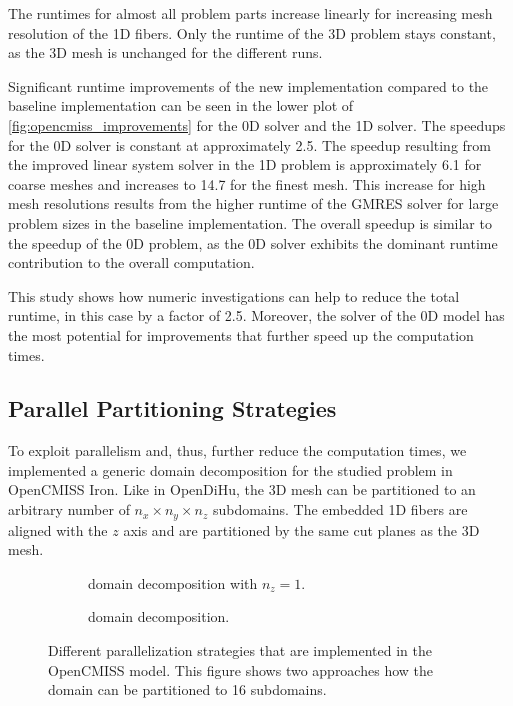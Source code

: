 The runtimes for almost all problem parts increase linearly for increasing mesh resolution of the 1D fibers. Only the runtime of the 3D problem stays constant, as the 3D mesh is unchanged for the different runs.

Significant runtime improvements of the new implementation compared to the baseline implementation can be seen in the lower plot of   \cref{fig:opencmiss_improvements} for the 0D solver and the 1D solver. The speedups for the 0D solver is constant at approximately 2.5. The speedup resulting from the improved linear system solver in the 1D problem is approximately 6.1 for coarse meshes and increases to 14.7 for the finest mesh. This increase for high mesh resolutions results from the higher runtime of the GMRES solver for large problem sizes in the baseline implementation. The overall speedup is similar to the speedup of the 0D problem, as the 0D solver exhibits the dominant runtime contribution to the overall computation.

This study shows how numeric investigations can help to reduce the total runtime, in this case by a factor of 2.5. Moreover, the solver of the 0D model has the most potential for improvements that further speed up the computation times.

\subsection{Parallel Partitioning Strategies}\label{sec:opencmiss_parallel_partitioning}

To exploit parallelism and, thus, further reduce the computation times, we implemented a generic domain decomposition for the studied problem in OpenCMISS Iron.
Like in OpenDiHu, the 3D mesh can be partitioned to an arbitrary number of $n_x \times n_y \times n_z$ subdomains. The embedded 1D fibers are aligned with the $z$ axis and are partitioned by the same cut planes as the 3D mesh.

\begin{figure}[H]
  \centering%
  \begin{subfigure}[t]{0.48\textwidth}%
    \centering%
    \def\svgwidth{0.7\textwidth}
    \caption{ domain decomposition with $n_z=1$.}%
    \label{fig:opencmiss_ddpillar}%
  \end{subfigure}
  \quad
  \begin{subfigure}[t]{0.48\textwidth}%
    \centering%
    \def\svgwidth{0.7\textwidth}
    \caption{ domain decomposition.}%
    \label{fig:opencmiss_ddcube}%
  \end{subfigure}   
  \caption{Different parallelization strategies that are implemented in the OpenCMISS model. This figure shows two approaches how the domain can be partitioned to 16 subdomains.}%
  \label{fig:opencmiss_dd_annotated}%
\end{figure}%

